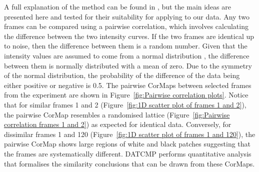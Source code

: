 A full explanation of the method can be found in \cite{franke2015correlation}, but the main ideas are presented here and tested for their suitability for applying to our data.
Any two frames can be compared using a pairwise correlation, which involves calculating the difference between the two intensity curves.
If the two frames are identical up to noise, then the difference between them is a random number.
Given that the intensity values are assumed to come from a normal distribution \cite{franke2015correlation}, the difference between them is normally distributed with a mean of zero.
Due to the symmetry of the normal distribution, the probability of the difference of the data being either positive or negative is 0.5.
The pairwise CorMaps between selected frames from the experiment are shown in Figure~\ref{fig:Pairwise correlation plots}.
Notice that for similar frames 1 and 2 (Figure~\ref{fig:1D scatter plot of frames 1 and 2}), the pairwise CorMap resembles a randomised lattice (Figure~\ref{fig:Pairwise correlation frames 1 and 2}) as expected for identical data.
Conversely, for dissimilar frames 1 and 120 (Figure~\ref{fig:1D scatter plot of frames 1 and 120}), the pairwise CorMap shows large regions of white and black patches suggesting that the frames are systematically different.
DATCMP performs quantitative analysis that formalises the similarity conclusions that can be drawn from these CorMaps.
